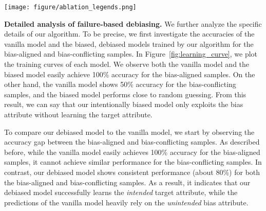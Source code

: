 \begin{figure*}[t!]
    \centering
    \texttt{[image: figure/ablation\_legends.png]}
    \\
    \vspace{-.1in}
    \caption{
    Learning curves of vanilla, biased, and debiased model for Colored MNIST and Corrupted CIFAR-10. For each dataset, the left and the right plots correspond to curves for the bias-aligned samples and the bias-conflicting samples, respectively. }
    \vspace{-.15in}
    \label{fig:learning_curve}
\end{figure*}   

 
\textbf{Detailed analysis of failure-based debiasing.}
We further analyze the specific details of our algorithm. To be precise, we first investigate the accuracies of the vanilla model and the biased, debiased models  trained by our algorithm for the bias-aligned and bias-conflicting samples. In Figure~\ref{fig:learning_curve}, we plot the training curves of each model. We observe both the vanilla model and the biased model easily achieve 100\% accuracy for the bias-aligned samples. On the other hand, the vanilla model shows 50\% accuracy for the bias-conflicting samples, and the biased model performs close to random guessing. From this result, we can say that our intentionally biased model only exploits the bias attribute without learning the target attribute. 

To compare our debiased model to the vanilla model, we start by observing the accuracy gap between the bias-aligned and bias-conflicting samples. As described before, while the vanilla model easily achieves 100\% accuracy for the bias-aligned samples, it cannot achieve similar performance for the bias-conflicting samples. In contrast, our debiased model shows consistent performance (about 80\%) for both the bias-aligned and bias-conflicting samples. As a result, it indicates that our debiased model successfully learns the \textit{intended} target attribute, while the predictions of the vanilla model heavily rely on the \textit{unintended} bias attribute.

